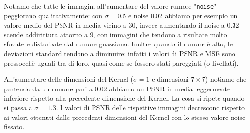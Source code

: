 Notiamo che tutte le immagini all'aumentare del valore rumore "\verb|noise|" peggiorano 
qualitativamente: 
con $\sigma = 0.5$ e noise 0.02 abbiamo per esempio un valore medio del PSNR in 
media vicino a 30, invece aumentando il noise a 0.32 scende addirittura attorno a 9, con 
immagini che tendono a risultare molto sfocate e disturbate dal rumore guassiano. 
Inoltre quando il rumore è alto, le deviazioni standard tendono a diminuire: 
infatti i valori di PSNR e MSE sono pressocchè uguali tra di loro, quasi come se fossero stati pareggiati (o livellati). 

All'aumentare delle dimensioni del Kernel ($\sigma = 1$ e dimensioni $7 \times 7$) notiamo che partendo 
da un rumore pari a 0.02 abbiamo un PSNR in media leggermente inferiore rispetto alla precedente 
dimensione del Kernel.
La cosa si ripete quando si passa a $\sigma = 1.3$.
I valori di PSNR delle rispettive immagini decrescono 
rispetto ai valori ottenuti dalle precedenti dimensioni del Kernel con lo stesso valore noise fissato.